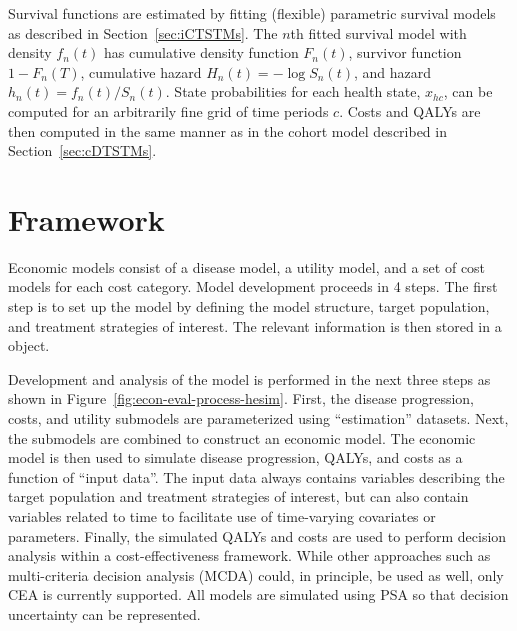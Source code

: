 \documentclass[article, nojss]{jss}\usepackage[]{graphicx}\usepackage[]{color}
\begin{document}
Survival functions are estimated by fitting (flexible) parametric survival models as described in Section~\ref{sec:iCTSTMs}. The $n$th fitted survival model with density $f_n(t)$ has cumulative density function $F_n(t)$, survivor function $1 - F_n(T)$, cumulative hazard $H_n(t) = -\log S_n(t)$, and hazard $h_n(t) = f_n(t)/S_n(t)$. State probabilities for each health state, $x_{hc}$, can be computed for an arbitrarily fine grid of time periods $c$. Costs and QALYs are then computed in the same manner as in the cohort model described in Section~\ref{sec:cDTSTMs}.

\section{Framework} \label{sec:framework}
Economic models consist of a disease model, a utility model, and a set of cost models for each cost category. Model development proceeds in 4 steps. The first step is to set up the model by defining the model structure, target population, and treatment strategies of interest. The relevant information is then stored in a  object. 

Development and analysis of the model is performed in the next three steps as shown in Figure~\ref{fig:econ-eval-process-hesim}. First, the disease progression, costs, and utility submodels are parameterized using ``estimation'' datasets. Next, the submodels are combined to construct an economic model. The economic model is then used to simulate disease progression, QALYs, and costs as a function of ``input data''. The input data always contains variables describing the target population and treatment strategies of interest, but can also contain variables related to time to facilitate use of time-varying covariates or parameters. Finally, the simulated QALYs and costs are used to perform decision analysis within a cost-effectiveness framework. While other approaches such as multi-criteria decision analysis (MCDA) could, in principle, be used as well, only CEA is currently supported. All models are simulated using PSA so that decision uncertainty can be represented.  
\end{document}
